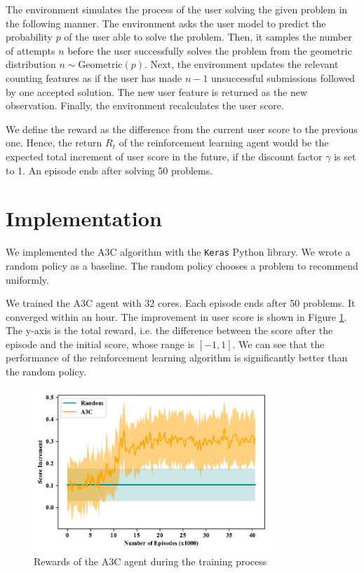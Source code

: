     The environment simulates the process of the user solving the given problem in the following manner.
    The environment asks the user model to predict the probability $p$ of the user able to solve the problem.
    Then, it samples the number of attempts $n$ before the user successfully solves the problem
    from the geometric distribution $n \sim \mathrm{Geometric}(p)$.
    Next, the environment updates the relevant counting features
    as if the user has made $n-1$ unsuccessful submissions followed by one accepted solution.
    The new user feature is returned as the new observation.
    Finally, the environment recalculates the user score.

    We define the reward as the difference from the current user score to the previous one.
    Hence, the return $R_t$ of the reinforcement learning agent
    would be the expected total increment of user score in the future,
    if the discount factor $\gamma$ is set to 1.
    An episode ends after solving 50 problems.

\section{Implementation}

    We implemented the A3C algorithm with the \verb|Keras|\cite{chollet2015keras} Python library.
    We wrote a random policy as a baseline.
    The random policy chooses a problem to recommend uniformly.

    We trained the A3C agent with 32 cores.
    Each episode ends after 50 problems.
    It converged within an hour.
    The improvement in user score is shown in Figure \ref{fig:a3c-episode-reward}.
    The y-axis is the total reward,
    i.e. the difference between the score after the episode and the initial score,
    whose range is $[-1,1]$.
    We can see that the performance of the reinforcement learning algorithm
    is significantly better than the random policy.

    \begin{figure}[htp]
        \centering
        \includegraphics[width=0.8\textwidth]{img/a3c-episode-reward.pdf}
        \caption{Rewards of the A3C agent during the training process}
        \label{fig:a3c-episode-reward}
    \end{figure}

